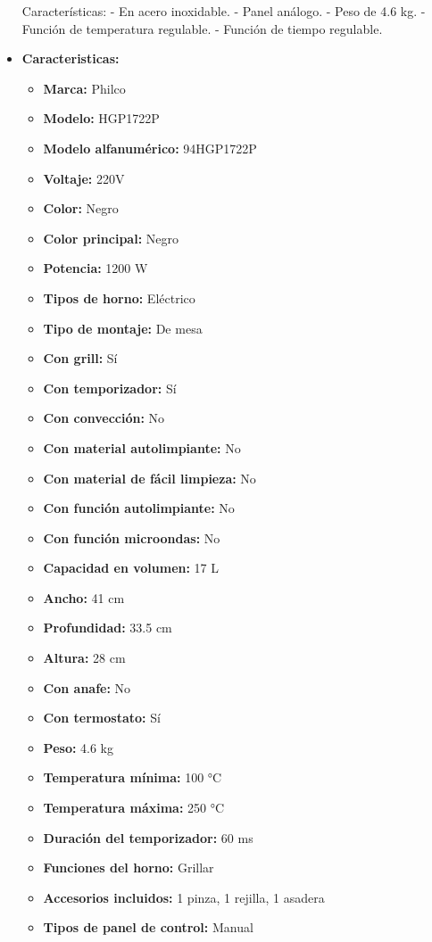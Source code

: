 \documentclass{article}
\begin{document}
\begin{adjustwidth}{2em}{}
\begin{itemize}
Características:
- En acero inoxidable.
- Panel análogo.
- Peso de 4.6 kg.
- Función de temperatura regulable.
- Función de tiempo regulable.
        \item \textbf{Caracteristicas:} 
        \begin{itemize}
            \item \textbf {Marca:} Philco
    \item \textbf {Modelo:} HGP1722P
    \item \textbf {Modelo alfanumérico:} 94HGP1722P
    \item \textbf {Voltaje:} 220V
    \item \textbf {Color:} Negro
    \item \textbf {Color principal:} Negro
    \item \textbf {Potencia:} 1200 W
    \item \textbf {Tipos de horno:} Eléctrico
    \item \textbf {Tipo de montaje:} De mesa
    \item \textbf {Con grill:} Sí
    \item \textbf {Con temporizador:} Sí
    \item \textbf {Con convección:} No
    \item \textbf {Con material autolimpiante:} No
    \item \textbf {Con material de fácil limpieza:} No
    \item \textbf {Con función autolimpiante:} No
    \item \textbf {Con función microondas:} No
    \item \textbf {Capacidad en volumen:} 17 L
    \item \textbf {Ancho:} 41 cm
    \item \textbf {Profundidad:} 33.5 cm
    \item \textbf {Altura:} 28 cm
    \item \textbf {Con anafe:} No
    \item \textbf {Con termostato:} Sí
    \item \textbf {Peso:} 4.6 kg
    \item \textbf {Temperatura mínima:} 100 °C
    \item \textbf {Temperatura máxima:} 250 °C
    \item \textbf {Duración del temporizador:} 60 ms
    \item \textbf {Funciones del horno:} Grillar
    \item \textbf {Accesorios incluidos:} 1 pinza, 1 rejilla, 1 asadera
    \item \textbf {Tipos de panel de control:} Manual
        \end{itemize}
    \end{itemize}

    \vspace{1\baselineskip} %
    \end{adjustwidth}
\end{document}
